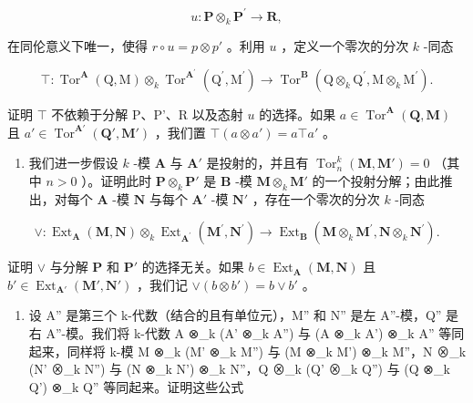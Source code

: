 \[
u: \mathbf {P} \otimes_ {k} \mathbf {P} ^ {\prime} \rightarrow \mathbf {R},
\]

在同伦意义下唯一，使得 \(r \circ u = p \otimes p'\) 。利用 \(u\) ，定义一个零次的分次 \(k\) -同态

\[
\top : \operatorname{Tor} ^ {\mathbf {A}} (\mathrm{Q}, \mathrm{M}) \otimes_ {k} \operatorname{Tor} ^ {\mathbf {A} ^ {\prime}} (\mathrm{Q} ^ {\prime}, \mathrm{M} ^ {\prime}) \rightarrow \operatorname{Tor} ^ {\mathbf {B}} (\mathrm{Q} \otimes_ {k} \mathrm{Q} ^ {\prime}, \mathrm{M} \otimes_ {k} \mathrm{M} ^ {\prime}).
\]

证明 \(\top\) 不依赖于分解 P、P'、R 以及态射 \(u\) 的选择。如果 \(a \in \operatorname{Tor}^{\mathbf{A}}(\mathbf{Q}, \mathbf{M})\) 且 \(a' \in \operatorname{Tor}^{\mathbf{A}'}(\mathbf{Q}', \mathbf{M}')\) ，我们置 \(\top(a \otimes a') = a \top a'\) 。

\begin{enumerate}
\def\labelenumi{\alph{enumi})}
\setcounter{enumi}{1}
\tightlist
\item
  我们进一步假设 \(k\) -模 \(\mathbf{A}\) 与 \(\mathbf{A}'\) 是投射的，并且有 \(\operatorname{Tor}_n^k (\mathbf{M},\mathbf{M}') = 0\) （其中 \(n > 0\) ）。证明此时 \(\mathbf{P} \otimes_k \mathbf{P}'\) 是 \(\mathbf{B}\) -模 \(\mathbf{M} \otimes_k \mathbf{M}'\) 的一个投射分解；由此推出，对每个 \(\mathbf{A}\) -模 \(\mathbf{N}\) 与每个 \(\mathbf{A}'\) -模 \(\mathbf{N}'\) ，存在一个零次的分次 \(k\) -同态
\end{enumerate}

\[
\vee : \operatorname{Ext} _ {\mathbf {A}} (\mathbf {M}, \mathbf {N}) \otimes_ {k} \operatorname{Ext} _ {\mathbf {A} ^ {\prime}} (\mathbf {M} ^ {\prime}, \mathbf {N} ^ {\prime}) \rightarrow \operatorname{Ext} _ {\mathbf {B}} (\mathbf {M} \otimes_ {k} \mathbf {M} ^ {\prime}, \mathbf {N} \otimes_ {k} \mathbf {N} ^ {\prime}).
\]

证明 \(\vee\) 与分解 \(\mathbf{P}\) 和 \(\mathbf{P}'\) 的选择无关。如果 \(b \in \operatorname{Ext}_{\mathbf{A}}(\mathbf{M}, \mathbf{N})\) 且 \(b' \in \operatorname{Ext}_{\mathbf{A}'}(\mathbf{M}', \mathbf{N}')\) ，我们记 \(\vee (b \otimes b') = b \vee b'\) 。

\begin{enumerate}
\def\labelenumi{\alph{enumi})}
\setcounter{enumi}{2}
\tightlist
\item
  设 A'' 是第三个 k-代数（结合的且有单位元），M'' 和 N'' 是左 A''-模，Q'' 是右 A''-模。我们将 k-代数 A ⊗\_k (A' ⊗\_k A'') 与 (A ⊗\_k A') ⊗\_k A'' 等同起来，同样将 k-模 M ⊗\_k (M' ⊗\_k M'') 与 (M ⊗\_k M') ⊗\_k M''，N ⊗\_k (N' ⊗\_k N'') 与 (N ⊗\_k N') ⊗\_k N''，Q ⊗\_k (Q' ⊗\_k Q'') 与 (Q ⊗\_k Q') ⊗\_k Q'' 等同起来。证明这些公式
\end{enumerate}

